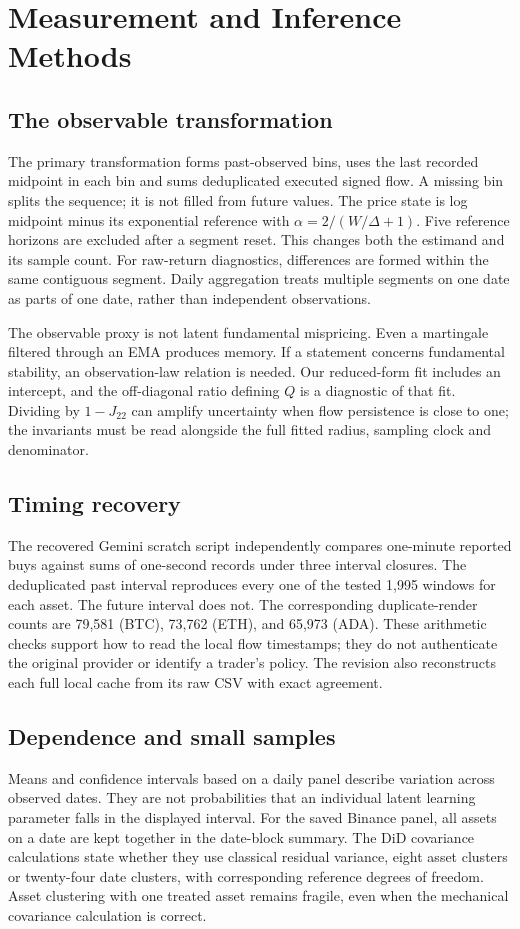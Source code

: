 \section{Measurement and Inference Methods}
\subsection{The observable transformation}
The primary transformation forms past-observed bins, uses the last recorded midpoint in each bin and sums deduplicated executed signed flow. A missing bin splits the sequence; it is not filled from future values. The price state is log midpoint minus its exponential reference with $\alpha=2/(W/\Delta+1)$. Five reference horizons are excluded after a segment reset. This changes both the estimand and its sample count. For raw-return diagnostics, differences are formed within the same contiguous segment. Daily aggregation treats multiple segments on one date as parts of one date, rather than independent observations.

The observable proxy is not latent fundamental mispricing. Even a martingale filtered through an EMA produces memory. If a statement concerns fundamental stability, an observation-law relation is needed. Our reduced-form fit includes an intercept, and the off-diagonal ratio defining $Q$ is a diagnostic of that fit. Dividing by $1-J_{22}$ can amplify uncertainty when flow persistence is close to one; the invariants must be read alongside the full fitted radius, sampling clock and denominator.

\subsection{Timing recovery}
The recovered Gemini scratch script independently compares one-minute reported buys against sums of one-second records under three interval closures. The deduplicated past interval reproduces every one of the tested 1,995 windows for each asset. The future interval does not. The corresponding duplicate-render counts are 79,581 (BTC), 73,762 (ETH), and 65,973 (ADA). These arithmetic checks support how to read the local flow timestamps; they do not authenticate the original provider or identify a trader's policy. The revision also reconstructs each full local cache from its raw CSV with exact agreement.

\subsection{Dependence and small samples}
Means and confidence intervals based on a daily panel describe variation across observed dates. They are not probabilities that an individual latent learning parameter falls in the displayed interval. For the saved Binance panel, all assets on a date are kept together in the date-block summary. The DiD covariance calculations state whether they use classical residual variance, eight asset clusters or twenty-four date clusters, with corresponding reference degrees of freedom. Asset clustering with one treated asset remains fragile, even when the mechanical covariance calculation is correct.

